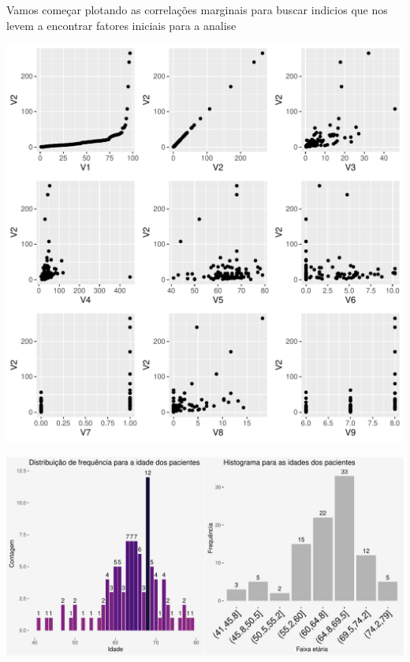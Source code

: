 \documentclass[runningheads]{llncs}\usepackage[]{graphicx}\usepackage[]{color}
\makeatletter
\def\maxwidth{ %
  \ifdim\Gin@nat@width>\linewidth
    \linewidth
  \else
    \Gin@nat@width
  \fi
}
\newenvironment{knitrout}{}{} %
\makeatother
\begin{document}
Vamos começar plotando as correlações marginais para buscar indicios que nos levem a encontrar fatores iniciais para a analise  



\begin{knitrout}
\color{fgcolor}
\includegraphics[width=\maxwidth]{figure/unnamed-chunk-4-1} 

\end{knitrout}
\begin{knitrout}
\color{fgcolor}
\includegraphics[width=\maxwidth]{figure/unnamed-chunk-5-1} 

\end{knitrout}
\end{document}
